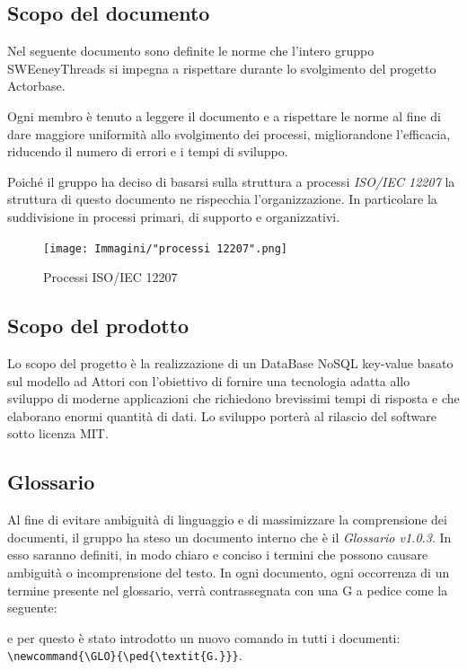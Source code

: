 \documentclass[a4paper]{article}
\begin{document}
		\subsection{Scopo del documento}
			Nel seguente documento sono definite le norme che l'intero gruppo SWEeneyThreads si
			impegna a rispettare durante lo svolgimento
			del progetto Actorbase.

			Ogni membro è tenuto a leggere il documento e a rispettare le norme al fine di dare maggiore uniformità
			allo svolgimento dei processi,
			migliorandone l'efficacia, riducendo il numero di errori e i tempi di sviluppo.

			Poiché il gruppo ha deciso di basarsi sulla struttura a processi \emph{ISO/IEC 12207}
			la struttura di questo documento ne rispecchia
			l'organizzazione. In particolare la suddivisione in processi primari, di supporto e organizzativi.
			\begin{figure}[H]
				\centering
				\texttt{[image: Immagini/"processi 12207".png]}
				\caption{Processi ISO/IEC 12207}
			\end{figure}
		\subsection{Scopo del prodotto}
			Lo scopo del progetto è la realizzazione di un DataBase NoSQL key-value basato sul modello ad
			Attori con l'obiettivo di fornire una tecnologia adatta allo sviluppo di moderne
			applicazioni che richiedono brevissimi tempi di risposta e che elaborano enormi quantità
			di dati. Lo sviluppo porterà al rilascio del software sotto licenza MIT.
		\subsection{Glossario}
			Al fine di evitare ambiguità di linguaggio e di massimizzare la comprensione dei documenti, il
	      	gruppo ha steso un documento interno che è il \emph{Glossario v1.0.3}. In esso saranno definiti, in modo
	      	chiaro e conciso i termini che possono causare ambiguità o incomprensione del testo. In ogni documento,
	      	ogni occorrenza di un termine presente nel glossario, verrà contrassegnata con una G a pedice come la seguente:
	      	\newline
	      	\begin{center}
	      	\end{center}
	      	e per questo è stato introdotto un nuovo comando in tutti i documenti: \\
	      	\verb|\newcommand{\GLO}{\ped{\textit{G.}}}|.
\end{document}

